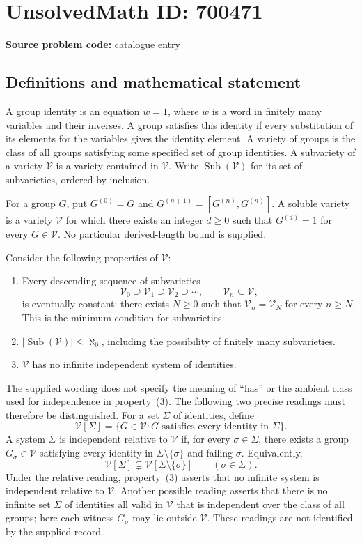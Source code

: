 \documentclass[11pt]{article}
\begin{document}
\section*{UnsolvedMath ID: 700471}
\textbf{Source problem code:} catalogue entry
\subsection{Definitions and mathematical statement}
A group identity is an equation \(w=1\), where \(w\) is a word in finitely many variables and their inverses. A group satisfies this identity if every substitution of its elements for the variables gives the identity element. A variety of groups is the class of all groups satisfying some specified set of group identities. A subvariety of a variety \(\mathcal V\) is a variety contained in \(\mathcal V\). Write \(\operatorname{Sub}(\mathcal V)\) for its set of subvarieties, ordered by inclusion.

For a group \(G\), put \(G^{(0)}=G\) and \(G^{(n+1)}=[G^{(n)},G^{(n)}]\). A soluble variety is a variety \(\mathcal V\) for which there exists an integer \(d\geq 0\) such that \(G^{(d)}=1\) for every \(G\in\mathcal V\). No particular derived-length bound is supplied.

Consider the following properties of \(\mathcal V\):
\begin{enumerate}
\item Every descending sequence of subvarieties
\[
\mathcal V_0\supseteq\mathcal V_1\supseteq\mathcal V_2\supseteq\cdots,
\qquad \mathcal V_n\subseteq\mathcal V,
\]
is eventually constant: there exists \(N\geq 0\) such that \(\mathcal V_n=\mathcal V_N\) for every \(n\geq N\). This is the minimum condition for subvarieties.
\item \(\lvert\operatorname{Sub}(\mathcal V)\rvert\leq\aleph_0\), including the possibility of finitely many subvarieties.
\item \(\mathcal V\) has no infinite independent system of identities.
\end{enumerate}

The supplied wording does not specify the meaning of ``has'' or the ambient class used for independence in property~(3). The following two precise readings must therefore be distinguished. For a set \(\Sigma\) of identities, define
\[
\mathcal V[\Sigma]=\{G\in\mathcal V: G\text{ satisfies every identity in }\Sigma\}.
\]
A system \(\Sigma\) is independent relative to \(\mathcal V\) if, for every \(\sigma\in\Sigma\), there exists a group \(G_\sigma\in\mathcal V\) satisfying every identity in \(\Sigma\setminus\{\sigma\}\) and failing \(\sigma\). Equivalently,
\[
\mathcal V[\Sigma]\subsetneq\mathcal V[\Sigma\setminus\{\sigma\}]
\qquad(\sigma\in\Sigma).
\]
Under the relative reading, property~(3) asserts that no infinite system is independent relative to \(\mathcal V\). Another possible reading asserts that there is no infinite set \(\Sigma\) of identities all valid in \(\mathcal V\) that is independent over the class of all groups; here each witness \(G_\sigma\) may lie outside \(\mathcal V\). These readings are not identified by the supplied record.
\end{document}
